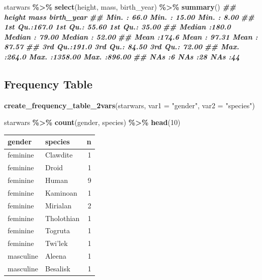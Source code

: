 \documentclass[
]{article}
\newenvironment{Shaded}{\begin{snugshade}}{\end{snugshade}}
\newcommand{\AttributeTok}[1]{\textcolor[rgb]{0.13,0.29,0.53}{#1}}
\newcommand{\DecValTok}[1]{\textcolor[rgb]{0.00,0.00,0.81}{#1}}
\newcommand{\DocumentationTok}[1]{\textcolor[rgb]{0.56,0.35,0.01}{\textbf{\textit{#1}}}}
\newcommand{\FunctionTok}[1]{\textcolor[rgb]{0.13,0.29,0.53}{\textbf{#1}}}
\newcommand{\NormalTok}[1]{#1}
\newcommand{\SpecialCharTok}[1]{\textcolor[rgb]{0.81,0.36,0.00}{\textbf{#1}}}
\newcommand{\StringTok}[1]{\textcolor[rgb]{0.31,0.60,0.02}{#1}}
\newcounter{none} %
\begin{document}
\begin{Shaded}
\begin{Highlighting}[]
\NormalTok{starwars }\SpecialCharTok{\%\textgreater{}\%}
  \FunctionTok{select}\NormalTok{(height, mass, birth\_year) }\SpecialCharTok{\%\textgreater{}\%}
  \FunctionTok{summary}\NormalTok{()}
\DocumentationTok{\#\#      height           mass           birth\_year    }
\DocumentationTok{\#\#  Min.   : 66.0   Min.   :  15.00   Min.   :  8.00  }
\DocumentationTok{\#\#  1st Qu.:167.0   1st Qu.:  55.60   1st Qu.: 35.00  }
\DocumentationTok{\#\#  Median :180.0   Median :  79.00   Median : 52.00  }
\DocumentationTok{\#\#  Mean   :174.6   Mean   :  97.31   Mean   : 87.57  }
\DocumentationTok{\#\#  3rd Qu.:191.0   3rd Qu.:  84.50   3rd Qu.: 72.00  }
\DocumentationTok{\#\#  Max.   :264.0   Max.   :1358.00   Max.   :896.00  }
\DocumentationTok{\#\#  NA\textquotesingle{}s   :6       NA\textquotesingle{}s   :28        NA\textquotesingle{}s   :44}
\end{Highlighting}
\end{Shaded}

\subsection{Frequency Table}\label{frequency-table}

\begin{Shaded}
\begin{Highlighting}[]
\FunctionTok{create\_frequency\_table\_2vars}\NormalTok{(starwars, }\AttributeTok{var1 =} \StringTok{"gender"}\NormalTok{, }\AttributeTok{var2 =} \StringTok{"species"}\NormalTok{)}
\end{Highlighting}
\end{Shaded}

\begin{Shaded}
\begin{Highlighting}[]
\NormalTok{starwars }\SpecialCharTok{\%\textgreater{}\%}
  \FunctionTok{count}\NormalTok{(gender, species) }\SpecialCharTok{\%\textgreater{}\%}
  \FunctionTok{head}\NormalTok{(}\DecValTok{10}\NormalTok{)}
\end{Highlighting}
\end{Shaded}

{\def\LTcaptype{none} %
\begin{longtable}[]{@{}llr@{}}
\toprule\noalign{}
gender & species & n \\
\midrule\noalign{}
\endhead
\bottomrule\noalign{}
\endlastfoot
feminine & Clawdite & 1 \\
feminine & Droid & 1 \\
feminine & Human & 9 \\
feminine & Kaminoan & 1 \\
feminine & Mirialan & 2 \\
feminine & Tholothian & 1 \\
feminine & Togruta & 1 \\
feminine & Twi'lek & 1 \\
masculine & Aleena & 1 \\
masculine & Besalisk & 1 \\
\end{longtable}
}
\end{document}
